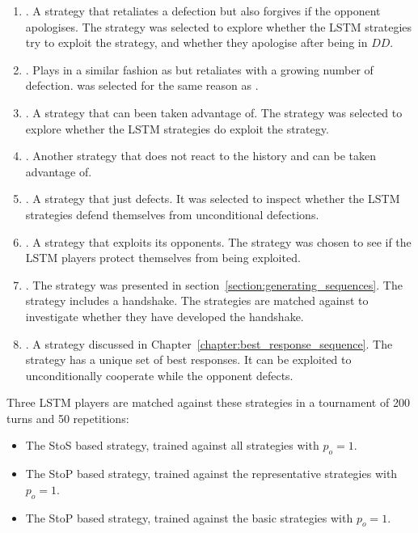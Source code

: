 \begin{enumerate}
    \item \TitForTat. A strategy that retaliates
    a defection but also forgives if the opponent apologises. The strategy was
    selected to explore whether the LSTM strategies try to exploit the strategy,
    and whether they apologise after being in \(DD\).
    \item \Gradual. Plays in a similar fashion as \TitForTat but
    retaliates with a growing number of defection. \Gradual was selected for the
    same reason as \TitForTat.
    \item \Cooperator. A strategy that can been taken advantage
    of. The strategy was selected to explore whether the LSTM strategies do
    exploit the strategy.
    \item \Alternator. Another strategy that does not react to the history
    and can be taken advantage of.
    \item \Defector. A strategy that just defects. It was selected to inspect
    whether the LSTM strategies defend themselves from unconditional defections.
    \item \ZDExtortTwo. A strategy that exploits its opponents. The
    strategy was chosen to see if the LSTM players protect themselves from being
    exploited.
    \item \TFOne. The strategy was presented in
    section~\ref{section:generating_sequences}. The strategy includes a
    handshake. The strategies are matched against \TFOne to investigate whether they
    have developed the handshake.
    \item \Adaptive. A strategy discussed in
    Chapter~\ref{chapter:best_response_sequence}. The strategy has a unique set
    of best responses. It can be exploited to unconditionally cooperate while
    the opponent defects.
\end{enumerate} 

Three LSTM players are matched against these strategies in a tournament of
200 turns and 50 repetitions:

\begin{itemize}
    \item The StoS based strategy, trained against all strategies with $p_o=1$.
    \item The StoP based strategy, trained against the representative strategies with $p_o=1$.
    \item The StoP based strategy, trained against the basic strategies with $p_o=1$.
\end{itemize}

